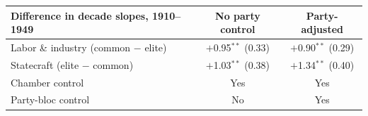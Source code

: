 \begin{tabular}{lcc}
\toprule
Difference in decade slopes, 1910--1949 & No party control & Party-adjusted \\
\midrule
Labor \& industry (common $-$ elite) & $+$0.95$^{**}$ (0.33) & $+$0.90$^{**}$ (0.29) \\
Statecraft (elite $-$ common) & $+$1.03$^{**}$ (0.38) & $+$1.34$^{**}$ (0.40) \\
\midrule
Chamber control & Yes & Yes \\
Party-bloc control & No & Yes \\
\bottomrule
\end{tabular}
